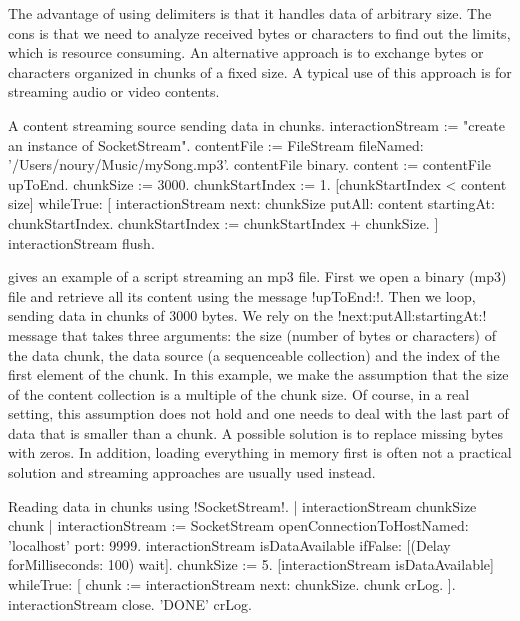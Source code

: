 \documentclass[a4paper,10pt,twoside]{book}
\begin{document}


The advantage of using delimiters is that it handles data of arbitrary size.
The cons is that we need to analyze received bytes or characters to find out the limits, which is resource consuming.
An alternative approach is to exchange bytes or characters organized in chunks of a fixed size.
A typical use of this approach is for streaming audio or video contents.

\begin{script}{A content streaming source sending data in chunks.}
interactionStream := "create an instance of SocketStream". 
contentFile := FileStream fileNamed: '/Users/noury/Music/mySong.mp3'.
contentFile binary.
content := contentFile upToEnd.
chunkSize := 3000.
chunkStartIndex := 1.
[chunkStartIndex < content size] whileTrue: [
	interactionStream next: chunkSize putAll: content startingAt: chunkStartIndex.
	chunkStartIndex := chunkStartIndex + chunkSize.
]
interactionStream flush.
\end{script}

 gives an example of a script streaming an mp3 file.
First we open a binary (mp3) file and retrieve all its content using the message \ct!upToEnd:!.
Then we loop, sending data in chunks of 3000 bytes.
We rely on the \ct!next:putAll:startingAt:! message that takes three arguments: the size (number of bytes or characters) of the data chunk,
the data source (a sequenceable collection) and the index of the first element of the chunk.
In this example, we make the assumption that the size of the content collection is a multiple of the chunk size.
Of course, in a real setting, this assumption does not hold and one needs to deal with the last part of data that is smaller than a chunk. A possible solution is to replace missing bytes with zeros. In addition, loading everything in memory first is often not a practical solution and streaming approaches are usually used instead.

\begin{script}{Reading data in chunks using \ct!SocketStream!.}
	| interactionStream chunkSize chunk |
	interactionStream := SocketStream 
											openConnectionToHostNamed: 'localhost' 
											port: 9999.
	interactionStream isDataAvailable ifFalse: [(Delay forMilliseconds: 100) wait].
	chunkSize := 5.
	[interactionStream isDataAvailable] whileTrue: [
		chunk  :=  interactionStream next: chunkSize.
		chunk crLog.
	].
	interactionStream close.
	'DONE' crLog.
\end{script}
\end{document}
